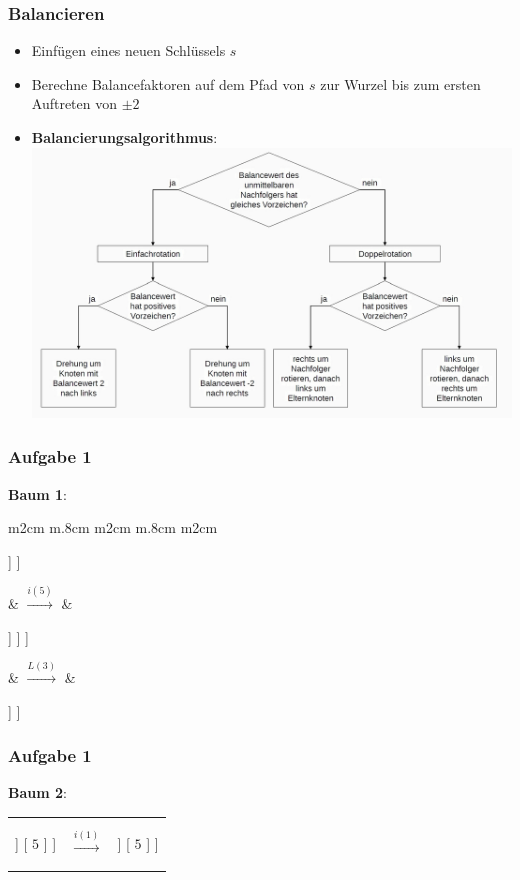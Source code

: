 \documentclass{beamer}
\begin{document}
\begin{frame} \frametitle{Balancieren}
	\begin{itemize}
		\item Einfügen eines neuen Schlüssels $s$
		\item Berechne Balancefaktoren auf dem Pfad von $s$ zur Wurzel bis zum ersten Auftreten von $\pm 2$
		\pause
		\item \textbf{Balancierungsalgorithmus}: 
		\includegraphics[width=\linewidth]{./tut09_avl.jpg}
	\end{itemize}
\end{frame}

\begin{frame} \frametitle{Aufgabe 1}
	\textbf{Baum 1}:
	\begin{tabularx}{\linewidth}{m{2cm} m{.8cm} m{2cm} m{.8cm} m{2cm}}
		\begin{forest}
			[ $2$ [ $1$ ] [$3$ [,no edge, draw=none] [ $4$ ]  ] ] 
		\end{forest} 
		&
		$\overset{i(5)}{\longrightarrow}$
		&
		\begin{forest}
			[ $2^2$ [ $1$ ] [ $3^2$ [,no edge, draw=none] [ $4^1$ [,no edge, draw=none] [ $5^0$ ]  ] ]  ]
		\end{forest}  
		&
		$\overset{L(3)}{\longrightarrow}$
		&
		\begin{forest}
			[ $2$ [ $1$ ] [ $4$ [ $3$ ] [ $5$ ] ] ]
		\end{forest}
	\end{tabularx}
\end{frame}

\begin{frame} \frametitle{Aufgabe 1}
	\textbf{Baum 2}:
	
	\begin{tabularx}{\linewidth}{m{2cm} m{.8cm} m{4cm}}
		\begin{forest}
			[ $4$ [ $2$ [,no edge, draw=none] [ $3$ ]  ] [ $5$ ] ]
		\end{forest}
		&
		$\overset{i(1)}{\longrightarrow}$
		&
		\begin{forest}
			[ $4^{-1}$ [ $2^0$ [ $1^0$ ] [ $3$ ]  ] [ $5$ ] ]
		\end{forest} 
	\end{tabularx}
\end{frame}
\end{document}
